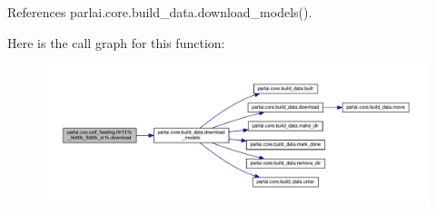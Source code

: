 References parlai.\+core.\+build\+\_\+data.\+download\+\_\+models().

Here is the call graph for this function\+:
\nopagebreak
\begin{figure}[H]
\begin{center}
\leavevmode
\includegraphics[width=350pt]{namespaceparlai_1_1zoo_1_1self__feeding_1_1hh131k__hb60k__fb60k__st1k_a5e051a30e8d35df6f02340333024100b_cgraph}
\end{center}
\end{figure}
